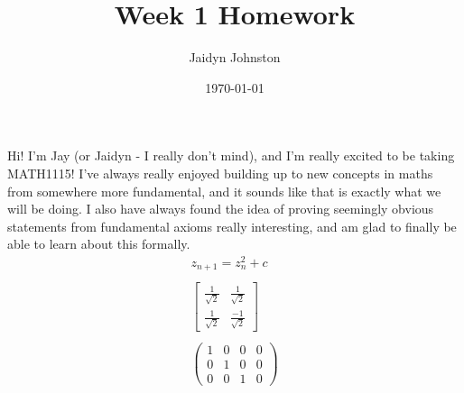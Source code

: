 \documentclass[12pt]{amsart}
\title{Week 1 Homework}
\author{Jaidyn Johnston}
\date{\today}
\begin{document}
\maketitle

Hi! I'm Jay (or Jaidyn - I really don't mind), and I'm really excited to be taking MATH1115! I've always really enjoyed building up to new concepts in maths from
somewhere more fundamental, and it sounds like that is exactly what we will be doing. I also have always found the idea of 
proving seemingly obvious statements from fundamental axioms really interesting, and am glad to finally be able to learn about
this formally.\\

\begin{gather*}
    z_{n+1} = z_{n}^{2} + c\\
    \\
    \begin{bmatrix}
        \frac{1}{\sqrt{2}}&\frac{1}{\sqrt{2}}\\
        \frac{1}{\sqrt{2}}&\frac{-1}{\sqrt{2}}
    \end{bmatrix}\\
    \\
    \begin{pmatrix}
        1&0&0&0\\
        0&1&0&0\\
        0&0&1&0
    \end{pmatrix}
\end{gather*}
\end{document}
